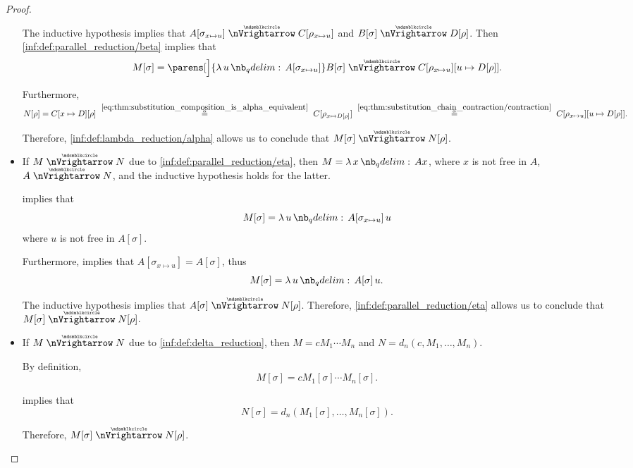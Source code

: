 \begin{proof}
\begin{itemize}
    The inductive hypothesis implies that \( A[\sigma_{x \mapsto u}] \ppred C[\rho_{x \mapsto u}] \) and \( B[\sigma] \ppred D[\rho] \). Then \ref{inf:def:parallel_reduction/beta} implies that
    \begin{equation*}
      M[\sigma]
      =
      \parens[\Big]{ \qabs u A[\sigma_{x \mapsto u}] } B[\sigma]
      \ppred
      C[\rho_{x \mapsto u}][u \mapsto D[\rho]].
    \end{equation*}

    Furthermore,
    \begin{equation*}
      N[\rho]
      =
      C[x \mapsto D][\rho]
      \reloset {\eqref{eq:thm:substitution_composition_is_alpha_equivalent}} \aequiv
      C[\rho_{x \mapsto D[\rho]}]
      \reloset {\eqref{eq:thm:substitution_chain_contraction/contraction}} \aequiv
      C[\rho_{x \mapsto u}][u \mapsto D[\rho]].
    \end{equation*}

    Therefore, \ref{inf:def:lambda_reduction/alpha} allows us to conclude that \( M[\sigma] \ppred N[\rho] \).

    \item If \( M \ppred N \) due to \ref{inf:def:parallel_reduction/eta}, then \( M = \qabs x Ax \), where \( x \) is not free in \( A \), \( A \ppred N \), and the inductive hypothesis holds for the latter.

     implies that
    \begin{equation*}
      M[\sigma] = \qabs u A[\sigma_{x \mapsto u}] \thinspace u
    \end{equation*}
    where \( u \) is not free in \( A[\sigma] \).

    Furthermore,  implies that \( A[\sigma_{x \mapsto u}] = A[\sigma] \), thus
    \begin{equation*}
      M[\sigma] = \qabs u A[\sigma] \thinspace u.
    \end{equation*}

    The inductive hypothesis implies that \( A[\sigma] \ppred N[\rho] \). Therefore, \ref{inf:def:parallel_reduction/eta} allows us to conclude that \( M[\sigma] \ppred N[\rho] \).

    \item If \( M \ppred N \) due to \ref{inf:def:delta_reduction}, then \( M = c M_1 \cdots M_n \) and \( N = d_n(c, M_1, \ldots, M_n) \).

    By definition,
    \begin{equation*}
      M[\sigma] = c M_1[\sigma] \cdots M_n[\sigma].
    \end{equation*}

     implies that
    \begin{equation*}
      N[\sigma] = d_n(M_1[\sigma], \ldots, M_n[\sigma]).
    \end{equation*}

    Therefore, \( M[\sigma] \ppred N[\rho] \).
  \end{itemize}
\end{proof}

